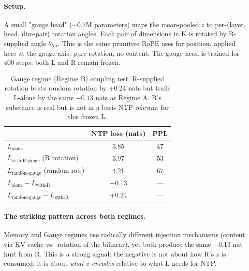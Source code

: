 \documentclass[10pt, twocolumn, a4paper]{article}
\begin{document}
\paragraph{Setup.} A small "gauge head" ($\sim 0.7$M parameters) maps the mean-pooled $z$ to per-(layer, head, dim-pair) rotation angles. Each pair of dimensions in K is rotated by R-supplied angle $\theta_{lhi}$. This is the same primitive RoPE uses for position, applied here at the gauge axis: pure rotation, no content. The gauge head is trained for 400 steps; both L and R remain frozen.

\begin{table}[h]
\centering\small
\begin{tabular}{@{}lcc@{}}
\toprule
& \textbf{NTP loss (nats)} & \textbf{PPL} \\
\midrule
$L_{\text{alone}}$                       & 3.85 & 47 \\
$L_{\text{with-R-gauge}}$ (R rotation)   & 3.97 & 53 \\
$L_{\text{random-gauge}}$ (random rot.)  & 4.21 & 67 \\
\midrule
$L_{\text{alone}} - L_{\text{with-R}}$           & $-0.13$ & --- \\
$L_{\text{random-gauge}} - L_{\text{with-R}}$   & $\mathbf{+0.24}$ & --- \\
\bottomrule
\end{tabular}
\caption{Gauge regime (Regime B) coupling test. R-supplied rotation beats random rotation by $+0.24$ nats but trails L-alone by the same $-0.13$ nats as Regime A. R's substance is real but is not in a basis NTP-relevant for this frozen L.}
\label{tab:regime_b}
\end{table}

\paragraph{The striking pattern across both regimes.} Memory and Gauge regimes use radically different injection mechanisms (content via KV cache vs.~rotation of the bilinear), yet both produce the same $-0.13$ nat hurt from R. This is a strong signal: the negative is not about how R's $z$ is consumed; it is about \emph{what $z$ encodes} relative to what L needs for NTP.
\end{document}
